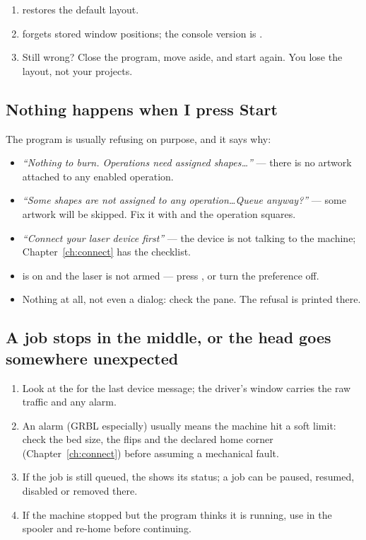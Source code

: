 \begin{enumerate}[label=\arabic*.,leftmargin=1.4em]
  \item {} restores the default layout.
  \item {} forgets stored window positions; the console
        version is .
  \item Still wrong? Close the program, move  aside, and start
        again. You lose the layout, not your projects.
\end{enumerate}

\subsection*{Nothing happens when I press Start}

The program is usually refusing on purpose, and it says why:

\begin{itemize}
  \item \emph{``Nothing to burn. Operations need assigned shapes\dots''} --- there
        is no artwork attached to any enabled operation.
  \item \emph{``Some shapes are not assigned to any operation\dots Queue
        anyway?''} --- some artwork will be skipped. Fix it with
         and the operation squares.
  \item \emph{``Connect your laser device first''} --- the device is not talking
        to the machine; Chapter~\ref{ch:connect} has the checklist.
  \item {} is on and the laser is not armed --- press
        , or turn the preference off.
  \item Nothing at all, not even a dialog: check the  pane. The
        refusal is printed there.
\end{itemize}

\subsection*{A job stops in the middle, or the head goes somewhere unexpected}

\begin{enumerate}[label=\arabic*.,leftmargin=1.4em]
  \item Look at the  for the last device message; the driver's
         window carries the raw traffic and any alarm.
  \item An alarm (GRBL especially) usually means the machine hit a soft limit:
        check the bed size, the flips and the declared home corner
        (Chapter~\ref{ch:connect}) before assuming a mechanical fault.
  \item If the job is still queued, the  shows its status; a job
        can be paused, resumed, disabled or removed there.
  \item If the machine stopped but the program thinks it is running, use
         in the spooler and re-home before continuing.
\end{enumerate}

